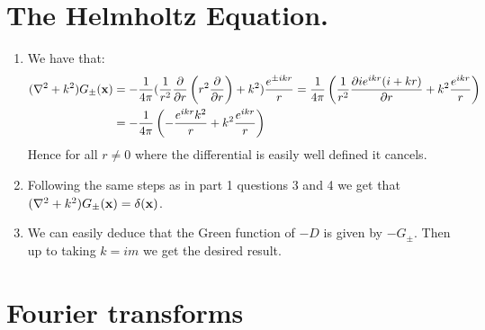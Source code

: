\documentclass[10pt,a4paper]{book}
\begin{document}
\section{The Helmholtz Equation.}

\begin{enumerate}

\item We have that:
\begin{align*}
(\laplacian + k^2) G_{\pm}(\vb{x}) &= -\frac{1}{4 \pi}(\frac{1}{r^2} \pdv{}{r} \left( r^2 \pdv{}{r}  \right) + k^2) \frac{e^{\pm i k r}}{r} = \frac{1}{4 \pi} \left( \frac{1}{r^2}\pdv{i e^{ik r} (i + kr)}{r} + k^2 \frac{e^{ikr}}{r} \right)\\
&= -\frac{1}{4\pi}\left( - \frac{e^{i k r} k^2}{r} + k^2 \frac{e^{ikr}}{r}  \right)
\end{align*}
Hence for all $r \neq 0$ where the differential is easily well defined it cancels.

\item Following the same steps as in part 1 questions 3 and 4 we get that $(\laplacian + k^2)G_{\pm}(\vb{x}) = \delta(\vb{x})$. 

\item We can easily deduce that the Green function of $-D$ is given by $-G_{\pm}$. Then up to taking $k = im$ we get the desired result. 

\end{enumerate}

\section{Fourier transforms}
\end{document}

